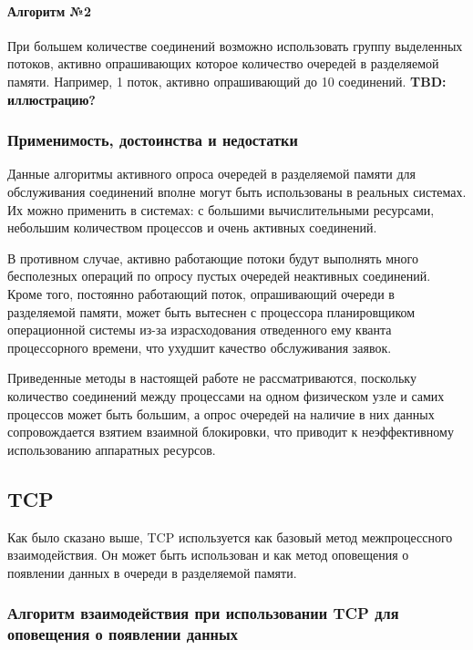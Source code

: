 \paragraph{Алгоритм №2}

При большем количестве соединений возможно использовать группу выделенных потоков, активно опрашивающих которое количество очередей в разделяемой памяти. Например, 1 поток, активно опрашивающий до 10 соединений.
\textbf{TBD: иллюстрацию?}

\subsubsection{Применимость, достоинства и недостатки}\label{chapter31:NaivePolling}

Данные алгоритмы активного опроса очередей в разделяемой памяти для обслуживания соединений вполне могут быть использованы в реальных системах. Их можно применить в системах: с большими вычислительными ресурсами, небольшим количеством процессов и очень активных соединений.

В противном случае, активно работающие потоки будут выполнять много бесполезных операций по опросу пустых очередей неактивных соединений. Кроме того, постоянно работающий поток, опрашивающий очереди в разделяемой памяти, может быть вытеснен с процессора планировщиком операционной системы из-за израсходования отведенного ему кванта процессорного времени, что ухудшит качество обслуживания заявок.

Приведенные методы в настоящей работе не рассматриваются, поскольку количество соединений между процессами на одном физическом узле и самих процессов может быть большим, а опрос очередей на наличие в них данных сопровождается взятием взаимной блокировки, что приводит к неэффективному использованию аппаратных ресурсов.

\subsection{TCP}\label{chapter31:SignalTCP}

Как было сказано выше, TCP используется как базовый метод межпроцессного взаимодействия. Он может быть использован и как метод оповещения о появлении данных в очереди в разделяемой памяти.

\subsubsection{Алгоритм взаимодействия при использовании TCP для оповещения о появлении данных}

